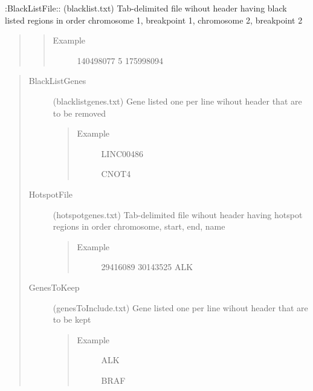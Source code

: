 \documentclass[letterpaper,10pt,english]{sphinxmanual}
\begin{document}
:BlackListFile:: (blacklist.txt) Tab-delimited file wihout header having black listed regions in order chromosome 1, breakpoint 1, chromosome 2, breakpoint 2
\begin{quote}
\begin{quote}\begin{description}
\item[{Example}]        140498077       5       175998094

\end{description}\end{quote}
\end{quote}
\begin{quote}\begin{description}
\item[{BlackListGenes}] \leavevmode
(blacklistgenes.txt) Gene listed one per line wihout header that are to be removed
\begin{quote}\begin{description}
\item[{Example}] \leavevmode
LINC00486

CNOT4

\end{description}\end{quote}

\item[{HotspotFile}] \leavevmode
(hotspotgenes.txt) Tab-delimited file wihout header having hotspot regions in order chromosome, start, end, name
\begin{quote}\begin{description}
\item[{Example}]        29416089        30143525        ALK

\end{description}\end{quote}

\item[{GenesToKeep}] \leavevmode
(genesToInclude.txt) Gene listed one per line wihout header that are to be kept
\begin{quote}\begin{description}
\item[{Example}] \leavevmode
ALK

BRAF

\end{description}\end{quote}

\end{description}\end{quote}
\end{document}
